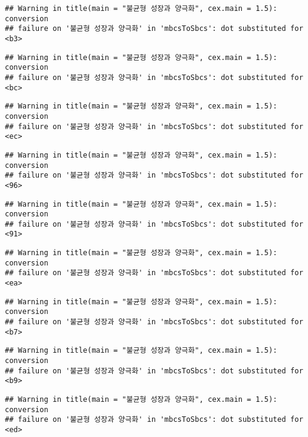 \documentclass[
]{article}
\begin{document}
\begin{verbatim}
## Warning in title(main = "불균형 성장과 양극화", cex.main = 1.5): conversion
## failure on '불균형 성장과 양극화' in 'mbcsToSbcs': dot substituted for <b3>
\end{verbatim}

\begin{verbatim}
## Warning in title(main = "불균형 성장과 양극화", cex.main = 1.5): conversion
## failure on '불균형 성장과 양극화' in 'mbcsToSbcs': dot substituted for <bc>
\end{verbatim}

\begin{verbatim}
## Warning in title(main = "불균형 성장과 양극화", cex.main = 1.5): conversion
## failure on '불균형 성장과 양극화' in 'mbcsToSbcs': dot substituted for <ec>
\end{verbatim}

\begin{verbatim}
## Warning in title(main = "불균형 성장과 양극화", cex.main = 1.5): conversion
## failure on '불균형 성장과 양극화' in 'mbcsToSbcs': dot substituted for <96>
\end{verbatim}

\begin{verbatim}
## Warning in title(main = "불균형 성장과 양극화", cex.main = 1.5): conversion
## failure on '불균형 성장과 양극화' in 'mbcsToSbcs': dot substituted for <91>
\end{verbatim}

\begin{verbatim}
## Warning in title(main = "불균형 성장과 양극화", cex.main = 1.5): conversion
## failure on '불균형 성장과 양극화' in 'mbcsToSbcs': dot substituted for <ea>
\end{verbatim}

\begin{verbatim}
## Warning in title(main = "불균형 성장과 양극화", cex.main = 1.5): conversion
## failure on '불균형 성장과 양극화' in 'mbcsToSbcs': dot substituted for <b7>
\end{verbatim}

\begin{verbatim}
## Warning in title(main = "불균형 성장과 양극화", cex.main = 1.5): conversion
## failure on '불균형 성장과 양극화' in 'mbcsToSbcs': dot substituted for <b9>
\end{verbatim}

\begin{verbatim}
## Warning in title(main = "불균형 성장과 양극화", cex.main = 1.5): conversion
## failure on '불균형 성장과 양극화' in 'mbcsToSbcs': dot substituted for <ed>
\end{verbatim}
\end{document}
